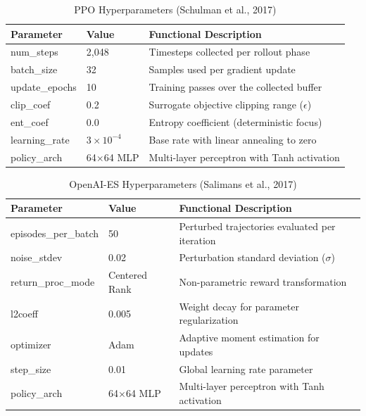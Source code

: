 \begin{table}[htbp]
\centering
\caption{PPO Hyperparameters (Schulman et al., 2017)}
\label{tab:ppo_hyperparameters}
\begin{tabular}{lll}
\toprule
\textbf{Parameter} & \textbf{Value} & \textbf{Functional Description} \\
\midrule
num\_steps      & 2,048              & Timesteps collected per rollout phase \\
batch\_size     & 32                 & Samples used per gradient update \\
update\_epochs  & 10                 & Training passes over the collected buffer \\
clip\_coef      & 0.2                & Surrogate objective clipping range ($\epsilon$) \\
ent\_coef       & 0.0                & Entropy coefficient (deterministic focus) \\
learning\_rate  & $3 \times 10^{-4}$ & Base rate with linear annealing to zero \\
policy\_arch    & 64$\times$64 MLP   & Multi-layer perceptron with Tanh activation \\
\bottomrule
\end{tabular}
\end{table}


\begin{table}[htbp]
\centering
\caption{OpenAI-ES Hyperparameters (Salimans et al., 2017)}
\label{tab:es_hyperparameters}
\begin{tabular}{lll}
\toprule
\textbf{Parameter} & \textbf{Value} & \textbf{Functional Description} \\
\midrule
episodes\_per\_batch & 50            & Perturbed trajectories evaluated per iteration \\
noise\_stdev         & 0.02          & Perturbation standard deviation ($\sigma$) \\
return\_proc\_mode   & Centered Rank & Non-parametric reward transformation \\
l2coeff              & 0.005         & Weight decay for parameter regularization \\
optimizer            & Adam          & Adaptive moment estimation for updates \\
step\_size           & 0.01          & Global learning rate parameter \\
policy\_arch         & 64$\times$64 MLP & Multi-layer perceptron with Tanh activation \\
\bottomrule
\end{tabular}
\end{table}



